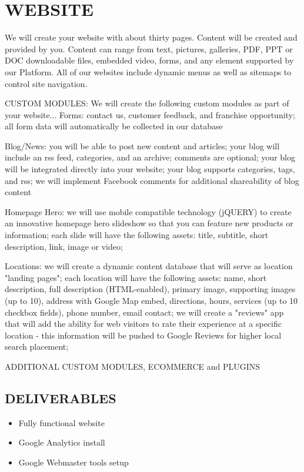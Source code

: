 \documentclass[12pt]{report}
\begin{document}
\section{WEBSITE}
\item We will create your website with about thirty pages. Content will be created and provided by you. Content can range from text, pictures, galleries, PDF, PPT or DOC downloadable files, embedded video, forms, and any element supported by our Platform. All of our websites include dynamic menus as well as sitemaps to control site navigation.
\item CUSTOM MODULES: We will create the following custom modules as part of your website...
Forms: contact us, customer feedback, and franchise opportunity; all form data will automatically be collected in our database
\item Blog/News: you will be able to post new content and articles; your blog will include an rss feed, categories, and an archive; comments are optional; your blog will be integrated directly into your website; your blog supports categories, tags, and rss; we will implement Facebook comments for additional shareability of blog content
\item Homepage Hero: we will use mobile compatible technology (jQUERY) to create an innovative homepage hero slideshow so that you can feature new products or information; each slide will have the following assets: title, subtitle, short description, link, image or video;
\item Locations: we will create a dynamic content database that will serve as location "landing pages"; each location will have the following assets: name, short description, full description (HTML-enabled), primary image, supporting images (up to 10), address with Google Map embed, directions, hours, services (up to 10 checkbox fields), phone number, email contact; we will create a "reviews" app that will add the ability for web visitors to rate their experience at a specific location - this information will be pushed to Google Reviews for higher local search placement;
\item [ADDITIONAL CUSTOM MODULES, ECOMMERCE and PLUGINS]
\subsection{DELIVERABLES}
\begin{itemize}
\item Fully functional website
\item Google Analytics install
\item Google Webmaster tools setup
\end{itemize}
\end{document}
